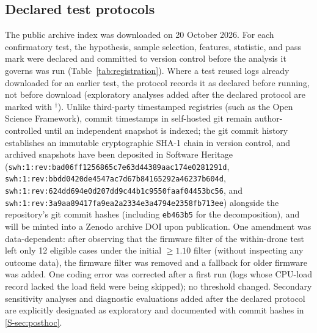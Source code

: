 \documentclass[preprint,12pt]{elsarticle}
\begin{document}
\subsection{Declared test protocols}
\label{sec:protocol}
The public archive index was downloaded on 20 October 2026. For each confirmatory test, the hypothesis, sample selection, features, statistic, and pass mark were declared and committed to version control before the analysis it governs was run (Table~\ref{tab:registration}). Where a test reused logs already downloaded for an earlier test, the protocol records it as declared before running, not before download (exploratory analyses added after the declared protocol are marked with $^\dagger$). Unlike third-party timestamped registries (such as the Open Science
Framework), commit timestamps in self-hosted git remain author-controlled until an independent snapshot is indexed; the git commit
history establishes an immutable cryptographic SHA-1 chain in version control, and archived snapshots have been deposited in
Software Heritage (\nolinkurl{swh:1:rev:bad06ff1256865c7e63d44389aac174e0281291d}, \nolinkurl{swh:1:rev:bbdd0420de4547ac7d67b84165292a46237b604d},
\nolinkurl{swh:1:rev:624dd694e0d207dd9c44b1c9550faaf04453bc56}, and \nolinkurl{swh:1:rev:3a9aa89417fa9ea2a2334e3a4794e2358fb713ee}) alongside
the repository's git commit hashes (including \texttt{eb463b5} for the decomposition), and will be minted into a Zenodo archive DOI upon publication. One amendment was data-dependent:
after observing that the firmware filter of the within-drone test left only 12 eligible cases under the initial $\ge 1.10$ filter
(without inspecting any outcome data), the firmware filter was removed and a fallback for older firmware was added. One coding error was corrected after a first run (logs whose CPU-load record
lacked the load field were being skipped); no threshold changed. Secondary sensitivity analyses and diagnostic
evaluations added after the declared protocol are explicitly designated as exploratory and documented with commit hashes in
\ref{S-sec:posthoc}.
\end{document}
